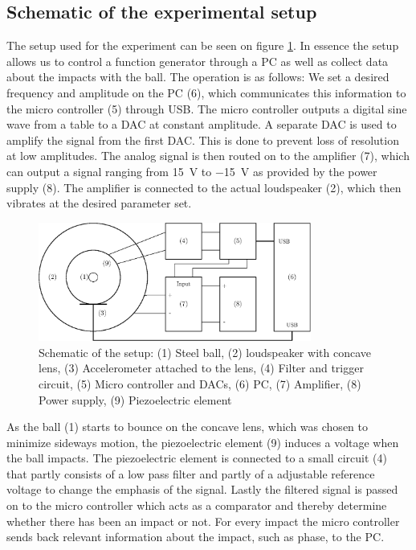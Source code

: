 \documentclass[12pt,oneside,a4paper]{article}
\numberwithin{equation}{section}
\begin{document}
{{{{\subsection{Schematic of the experimental setup}
The setup used for the experiment can be seen on figure \ref{setupdia}. In 
essence the setup allows us to control a function generator through a PC as 
well as collect data about the impacts with the ball. The operation is as 
follows: We set a desired frequency and amplitude on the PC (6), which 
communicates this information to the micro controller (5) through USB. The 
micro controller outputs a digital sine wave from a table to a DAC at constant 
amplitude. A separate DAC is used to amplify the signal from the first DAC. 
This is done to prevent loss of resolution at low amplitudes. The analog signal 
is then routed on to the amplifier (7), which can output a signal ranging from 
\SI{+15}{V} to \SI{-15}{V} as provided by the power supply (8). The amplifier 
is connected to the actual loudspeaker (2), which then vibrates at the 
desired parameter set.
\begin{figure}[h]
	\centering
	\includegraphics[width=0.8\textwidth]{setup}
	\caption{Schematic of the setup: (1) Steel ball, (2) loudspeaker with concave lens, (3) Accelerometer attached to the lens, (4) Filter and trigger circuit, (5) Micro controller and DACs, (6) PC, (7) Amplifier, (8) Power supply, (9) Piezoelectric element}
	\label{setupdia}
\end{figure}
As the ball (1) starts to bounce on the concave lens, which was chosen to 
minimize sideways motion, the piezoelectric element (9) induces a voltage when 
the ball impacts. The piezoelectric element is connected to a small circuit (4) 
that partly consists of a low pass filter and partly of a adjustable reference 
voltage to change the emphasis of the signal. Lastly the filtered signal is 
passed on to the micro controller which acts as a comparator and thereby 
determine whether there has been an impact or not. For every impact the micro 
controller sends back relevant information about the impact, such as phase, to 
the PC.

}}}}
\end{document}
